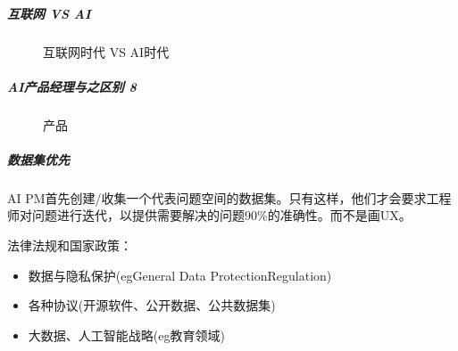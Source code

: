 \documentclass[letterpaper,11pt,english]{sphinxmanual}
\begin{document}
\subparagraph{互联网 VS AI}
\label{\detokenize{chapter_introduction/AI_PM:vs-ai}}
\begin{figure}[H]
\centering
\capstart

\noindent{}
\caption{互联网时代 VS AI时代\sphinxfootnotemark[76]}\label{\detokenize{chapter_introduction/AI_PM:id33}}\end{figure}
%
\begin{footnotetext}[76]\sphinxAtStartFootnote
{}
%
\end{footnotetext}\ignorespaces 

\subparagraph{AI产品经理与之区别 8\sphinxfootnotemark[77]}
\label{\detokenize{chapter_introduction/AI_PM:ai-8}}%
\begin{footnotetext}[77]\sphinxAtStartFootnote
{}
%
\end{footnotetext}\ignorespaces 
\begin{figure}[H]
\centering
\capstart

\noindent{}
\caption{产品}\label{\detokenize{chapter_introduction/AI_PM:id34}}\end{figure}


\subparagraph{数据集优先}
\label{\detokenize{chapter_introduction/AI_PM:id3}}
AI
PM首先创建/收集一个代表问题空间的数据集。只有这样，他们才会要求工程师对问题进行迭代，以提供需要解决的问题90\%的准确性。而不是画UX。

%
\begin{footnote}[78]\sphinxAtStartFootnote
{}
%
\end{footnote}

法律法规和国家政策：
%
\begin{footnote}[79]\sphinxAtStartFootnote
{}
%
\end{footnote}
\begin{itemize}
\item {} 
数据与隐私保护(egGeneral Data ProtectionRegulation)

\item {} 
各种协议(开源软件、公开数据、公共数据集)

\item {} 
大数据、人工智能战略(eg教育领域)

\end{itemize}
\end{document}
